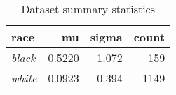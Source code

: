 \begin{table}[H]

\caption{\label{tab:dataset_summary}Dataset summary statistics}
\centering
\begin{tabular}[t]{>{}l|r|r|r}
\hline
race & mu & sigma & count\\
\hline
\em{black} & 0.5220 & 1.072 & 159\\
\hline
\em{white} & 0.0923 & 0.394 & 1149\\
\hline
\end{tabular}
\end{table}
